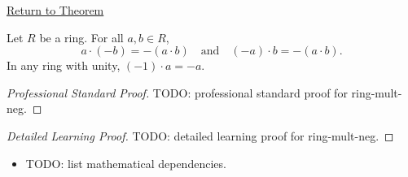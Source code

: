 \newpage
{}
\label{prf:ring-mult-neg}

\begin{remark*}[Return]
\hyperref[prop:ring-mult-neg]{Return to Theorem}
\end{remark*}

\begin{proposition*}
Let $R$ be a ring. For all $a, b \in R$,
\[
a \cdot (-b) = -(a \cdot b)
\quad\text{and}\quad
(-a) \cdot b = -(a \cdot b).
\]
In any ring with unity, $(-1) \cdot a = -a$.
\end{proposition*}

\begin{proof}[Professional Standard Proof]
\LRAProofBodyStart
TODO: professional standard proof for ring-mult-neg.
\end{proof}

\begin{proof}[Detailed Learning Proof]
\LRAProofBodyStart
TODO: detailed learning proof for ring-mult-neg.
\end{proof}

\begin{remark*}
\end{remark*}

\begin{dependencies}
\begin{itemize}
  \item TODO: list mathematical dependencies.
\end{itemize}
\end{dependencies}

\clearpage
